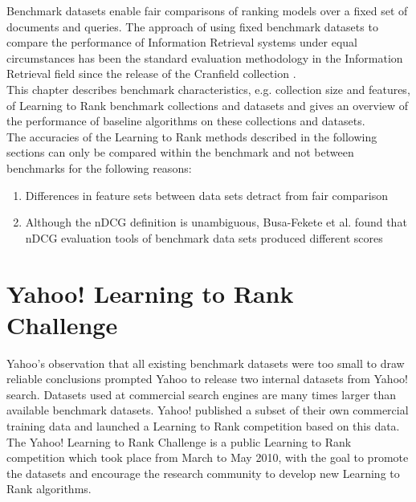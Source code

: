 \label{chap:benchmark_results}
Benchmark datasets enable fair comparisons of ranking models over a fixed set of documents and queries. The approach of using fixed benchmark datasets to compare the performance of Information Retrieval systems under equal circumstances has been the standard evaluation methodology in the Information Retrieval field since the release of the Cranfield collection \cite{Cleverdon1966}.\\

This chapter describes benchmark characteristics, e.g. collection size and features, of Learning to Rank benchmark collections and datasets and gives an overview of the performance of baseline algorithms on these collections and datasets.\\

The accuracies of the Learning to Rank methods described in the following sections can only be compared within the benchmark and not between benchmarks for the following reasons:
\begin{enumerate}
\item Differences in feature sets between data sets detract from fair comparison
\item Although the \ac{nDCG} definition is unambiguous, Busa-Fekete et al. \cite{Busa-Fekete2012} found that \ac{nDCG} evaluation tools of benchmark data sets produced different scores
\end{enumerate}

\section{Yahoo! Learning to Rank Challenge}
Yahoo's observation that all existing benchmark datasets were too small to draw reliable conclusions prompted Yahoo to release two internal datasets from Yahoo! search. Datasets used at commercial search engines are many times larger than available benchmark datasets. Yahoo! published a subset of their own commercial training data and launched a Learning to Rank competition based on this data. The Yahoo! Learning to Rank Challenge \cite{Chapelle2011a} is a public Learning to Rank competition which took place from March to May 2010, with the goal to promote the datasets and encourage the research community to develop new Learning to Rank algorithms.\\


